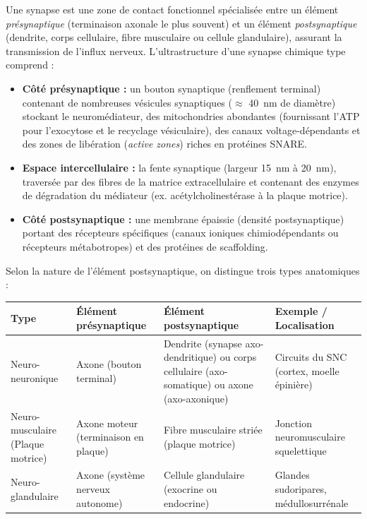 \documentclass[11pt]{article}
\newcommand{\cle}[1]{{\popxbold\color{popdark}#1}}
\begin{document}
\begin{definition}
Une \cle{synapse} est une zone de contact fonctionnel spécialisée entre un élément \emph{présynaptique} (terminaison axonale le plus souvent) et un élément \emph{postsynaptique} (dendrite, corps cellulaire, fibre musculaire ou cellule glandulaire), assurant la transmission de l'influx nerveux. L'\cle{ultrastructure} d'une synapse chimique type comprend :
\begin{itemize}
\item \textbf{Côté présynaptique :} un \cle{bouton synaptique} (renflement terminal) contenant de nombreuses \cle{vésicules synaptiques} ($\approx$ \SI{40}{nm} de diamètre) stockant le neuromédiateur, des \cle{mitochondries} abondantes (fournissant l'ATP pour l'exocytose et le recyclage vésiculaire), des canaux  voltage-dépendants et des zones de libération (\emph{active zones}) riches en protéines SNARE.
\item \textbf{Espace intercellulaire :} la \cle{fente synaptique} (largeur \SI{15}{nm} à \SI{20}{nm}), traversée par des fibres de la matrice extracellulaire et contenant des enzymes de dégradation du médiateur (ex. acétylcholinestérase à la plaque motrice).
\item \textbf{Côté postsynaptique :} une membrane épaissie (\cle{densité postsynaptique}) portant des \cle{récepteurs spécifiques} (canaux ioniques chimiodépendants ou récepteurs métabotropes) et des protéines de scaffolding.
\end{itemize}
\end{definition}

\begin{propriete}
Selon la nature de l'élément postsynaptique, on distingue trois types anatomiques :
\begin{center}
\begin{tabularx}{\linewidth}{|l|X|X|X|}\hline
\rowcolor{popblueL}
\textbf{Type} & \textbf{Élément présynaptique} & \textbf{Élément postsynaptique} & \textbf{Exemple / Localisation} \\ \hline
\cle{Neuro-neuronique} & Axone (bouton terminal) & Dendrite (synapse axo-dendritique) ou corps cellulaire (axo-somatique) ou axone (axo-axonique) & Circuits du SNC (cortex, moelle épinière) \\ \hline
\cle{Neuro-musculaire} (Plaque motrice) & Axone moteur (terminaison en plaque) & Fibre musculaire striée (plaque motrice) & Jonction neuromusculaire squelettique \\ \hline
\cle{Neuro-glandulaire} & Axone (système nerveux autonome) & Cellule glandulaire (exocrine ou endocrine) & Glandes sudoripares, médullosurrénale \\ \hline
\end{tabularx}
\end{center}
\end{propriete}
\end{document}
